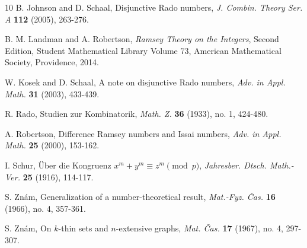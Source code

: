 \documentclass[11pt]{article}
\theoremstyle{definition}
\begin{document}
\begin{thebibliography}{10}
 B. Johnson and D. Schaal, Disjunctive Rado numbers, \textit{J. Combin. Theory Ser. A} \textbf{112} (2005), 263-276.

 B. M. Landman and A. Robertson, \textit{Ramsey Theory on the Integers}, Second Edition, Student Mathematical Library Volume 73, American Mathematical Society, Providence, 2014.

 W. Kosek and D. Schaal, A note on disjunctive Rado numbers, \textit{Adv. in Appl. Math.} \textbf{31} (2003), 433-439.

 R. Rado, Studien zur Kombinatorik, \textit{Math. Z.} \textbf{36} (1933), no. 1, 424-480.

 A. Robertson, Difference Ramsey numbers and Issai numbers, \textit{Adv. in Appl. Math.} \textbf{25} (2000), 153-162.

 I. Schur, \"{U}ber die Kongruenz $x^m+y^m\equiv z^m\pmod p$, \textit{Jahresber. Dtsch. Math.-Ver.} \textbf{25} (1916), 114-117.

 S. Zn\'{a}m, Generalization of a number-theoretical result, \textit{Mat.-Fyz. Čas.} \textbf{16} (1966), no. 4, 357-361.

 S. Zn\'{a}m, On $k$-thin sets and $n$-extensive graphs, \textit{Mat. Čas.} \textbf{17} (1967), no. 4, 297-307.
\end{thebibliography}
\end{document}
